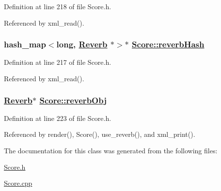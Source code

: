 Definition at line 218 of file Score.h.

Referenced by xml\_\-read().\hypertarget{classScore_o0}{
\subsubsection[reverbHash]{\setlength{\rightskip}{0pt plus 5cm}hash\_\-map$<$long, \hyperlink{classReverb}{Reverb} $\ast$$>$$\ast$ \hyperlink{classScore_o0}{Score::reverb\-Hash}}}
\label{classScore_o0}




Definition at line 217 of file Score.h.

Referenced by xml\_\-read().\hypertarget{classScore_r1}{
\subsubsection[reverbObj]{\setlength{\rightskip}{0pt plus 5cm}\hyperlink{classReverb}{Reverb}$\ast$ \hyperlink{classScore_r1}{Score::reverb\-Obj}}}
\label{classScore_r1}




Definition at line 223 of file Score.h.

Referenced by render(), Score(), use\_\-reverb(), and xml\_\-print().

The documentation for this class was generated from the following files:\begin{CompactItemize}
\item 
\hyperlink{Score_8h}{Score.h}\item 
\hyperlink{Score_8cpp}{Score.cpp}\end{CompactItemize}
